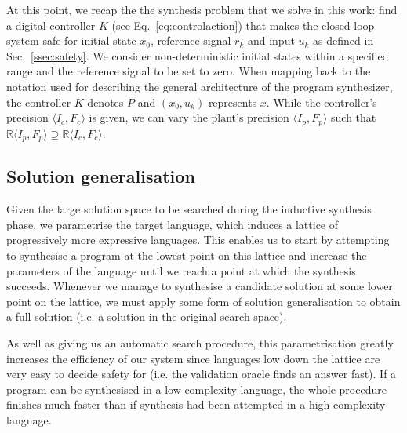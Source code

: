 \documentclass[runningheads,a4paper]{llncs}
\begin{document}

At this point, we recap the the synthesis problem that we solve in this work:
find a digital controller $K$ (see Eq.~\ref{eq:controlaction})
that makes the closed-loop system safe for 
initial state $x_0$, reference signal $r_k$ and input $u_k$
as defined in Sec.~\ref{ssec:safety}. 
We consider non-deterministic initial states within a specified range
and the reference signal to be set to zero.  
When mapping back to the notation used for describing the general architecture 
of the program synthesizer, the controller $K$ denotes $P$ and 
$(x_0, u_k)$ represents $x$. 
While the controller's precision $\langle I_c,F_c\rangle$ is given, 
we can vary the plant's precision $\langle I_p,F_p\rangle$ such that 
$\mathbb{R}\langle I_p,F_p \rangle \supseteq \mathbb{R}\langle I_c,F_c \rangle$.

\subsection{Solution generalisation} 
Given the large solution space to be searched during the inductive
synthesis phase, we parametrise the target language, which induces a
lattice of progressively more expressive languages.  This enables us
to start by attempting to synthesise a program at the lowest point on
this lattice and increase the parameters of the language until we
reach a point at which the synthesis succeeds. Whenever we manage to
synthesise a candidate solution at some lower point on the lattice, we
must apply some form of solution generalisation to obtain a full
solution (i.e. a solution in the original search space).

As well as giving us an automatic search procedure, this
parametrisation greatly increases the efficiency of our system since
languages low down the lattice are very easy to decide safety for
(i.e. the validation oracle finds an answer fast). If a program can be
synthesised in a low-complexity language, the whole procedure finishes
much faster than if synthesis had been attempted in a high-complexity
language.
\end{document}
